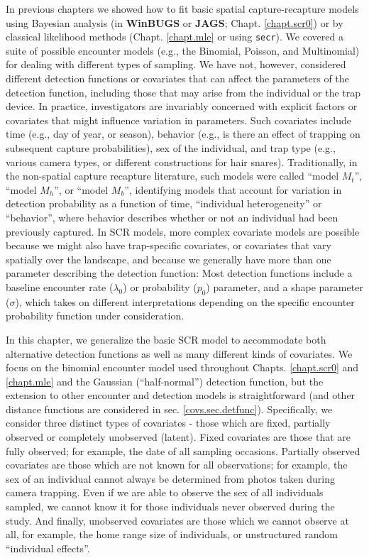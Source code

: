 In previous chapters we showed how to fit basic spatial
capture-recapture models using Bayesian analysis (in {\bf WinBUGS} or
{\bf JAGS};
Chapt. \ref{chapt.scr0}) or by classical likelihood methods
(Chapt. \ref{chapt.mle} or using \mbox{\tt secr}). We covered a suite of possible encounter models
(e.g., the Binomial, Poisson, and Multinomial) for
dealing with different types of sampling. We have not, however,
considered different detection functions or covariates that can affect
the parameters of the detection function, including those that may
arise from the individual or the trap device. In practice, 
investigators are invariably concerned
with explicit factors or covariates that might influence variation in
parameters. Such covariates
include time (e.g., day of year, or season), behavior (e.g., is there an 
effect of trapping on subsequent capture probabilities), sex of the individual, and trap
type (e.g., various camera types, or different constructions for hair
snares). Traditionally, in the non-spatial capture recapture
literature, such models were called ``model $M_t$'', ``model
$M_h$'', or ``model $M_b$'', identifying models that account for
variation in detection probability as a function of time, ``individual
heterogeneity'' or ``behavior'', where behavior describes
whether or not an individual had been previously captured. In SCR
models, more complex covariate models are possible because we might
also have trap-specific covariates, or covariates that vary spatially
over the landscape, and because we generally have more than one 
parameter describing the detection function:
Most detection functions include a baseline encounter
rate ($\lambda_0$) or probability ($p_0$) parameter, and a shape parameter
($\sigma$), which takes on different interpretations depending on
the specific encounter probability function under consideration. 

In this chapter, we generalize the basic SCR model to accommodate both 
alternative detection functions as well as
many different kinds of covariates. We focus on the binomial encounter
model used throughout Chapts. \ref{chapt.scr0} and \ref{chapt.mle} and
the Gaussian (``half-normal'') 
detection function,
but the extension to other encounter and detection models is
straightforward (and other distance functions are considered in sec. \ref{covs.sec.detfunc}). 
Specifically, we consider three distinct types of
covariates - those which are fixed, partially observed or completely
unobserved (latent).  Fixed covariates are those that are fully
observed; for example, the date of all sampling occasions.  Partially
observed covariates are those which are not known for all
observations; for example, the sex of an individual cannot always be
determined from photos taken during camera trapping.  Even if we are
able to observe the sex of all individuals sampled, we cannot know it
for those individuals never observed during the study.  And finally,
unobserved covariates are those which we cannot observe at all, for
example, the home range size of individuals, or unstructured random
``individual effects''.


